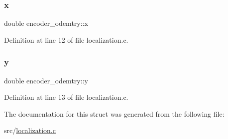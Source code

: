 \subsubsection{\texorpdfstring{x}{x}}
{\footnotesize\ttfamily double encoder\+\_\+odemtry\+::x}



Definition at line 12 of file localization.\+c.

\mbox{\label{structencoder__odemtry_a955cbea800158b8c0cd5f36b253fe6bb}} 
\subsubsection{\texorpdfstring{y}{y}}
{\footnotesize\ttfamily double encoder\+\_\+odemtry\+::y}



Definition at line 13 of file localization.\+c.



The documentation for this struct was generated from the following file\+:\begin{DoxyCompactItemize}
\item 
src/\hyperlink{localization_8c}{localization.\+c}\end{DoxyCompactItemize}
